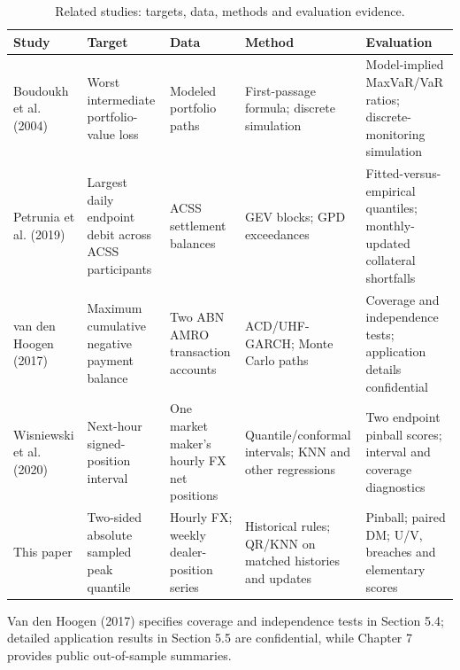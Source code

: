 \begin{table}[!htbp]
\centering\footnotesize
\caption{Related studies: targets, data, methods and evaluation evidence.}\label{tab:literature}
\begin{tabular}{>{\raggedright\arraybackslash}p{.14\linewidth}>{\raggedright\arraybackslash}p{.20\linewidth}>{\raggedright\arraybackslash}p{.14\linewidth}>{\raggedright\arraybackslash}p{.20\linewidth}>{\raggedright\arraybackslash}p{.20\linewidth}}
\toprule
Study & Target & Data & Method & Evaluation \\
\midrule
Boudoukh et al. (2004) & Worst intermediate portfolio-value loss & Modeled portfolio paths & First-passage formula; discrete simulation & Model-implied MaxVaR/VaR ratios; discrete-monitoring simulation \\
Petrunia et al. (2019) & Largest daily endpoint debit across ACSS participants & ACSS settlement balances & GEV blocks; GPD exceedances & Fitted-versus-empirical quantiles; monthly-updated collateral shortfalls \\
van den Hoogen (2017) & Maximum cumulative negative payment balance & Two ABN AMRO transaction accounts & ACD/UHF-GARCH; Monte Carlo paths & Coverage and independence tests; application details confidential \\
Wisniewski et al. (2020) & Next-hour signed-position interval & One market maker's hourly FX net positions & Quantile/conformal intervals; KNN and other regressions & Two endpoint pinball scores; interval and coverage diagnostics \\
This paper & Two-sided absolute sampled peak quantile & Hourly FX; weekly dealer-position series & Historical rules; QR/KNN on matched histories and updates & Pinball; paired DM; U/V, breaches and elementary scores \\
\bottomrule
\end{tabular}
\par\smallskip\begin{minipage}{\linewidth}\footnotesize Van den Hoogen (2017) specifies coverage and independence tests in Section 5.4; detailed application results in Section 5.5 are confidential, while Chapter 7 provides public out-of-sample summaries.\end{minipage}
\end{table}
